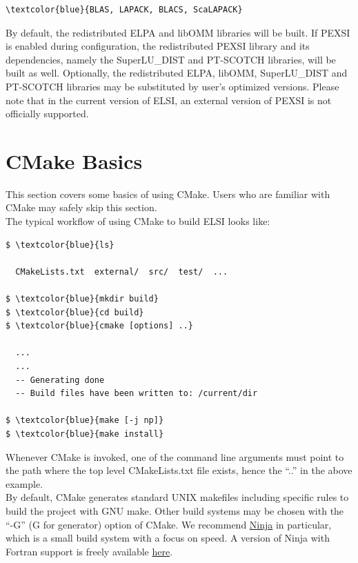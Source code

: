 \documentclass{report}
\begin{document}
\begin{Verbatim}[commandchars=\\\{\}]
\textcolor{blue}{BLAS, LAPACK, BLACS, ScaLAPACK}
\end{Verbatim}

By default, the redistributed ELPA and libOMM libraries will be built.  If PEXSI is enabled during configuration, the redistributed PEXSI library and its dependencies, namely the SuperLU\_DIST and PT-SCOTCH libraries, will be built as well.  Optionally, the redistributed ELPA, libOMM, SuperLU\_DIST and PT-SCOTCH libraries may be substituted by user's optimized versions.  Please note that in the current version of ELSI, an external version of PEXSI is not officially supported.\\

\section{CMake Basics}
\label{sec:cmake}
This section covers some basics of using CMake.  Users who are familiar with CMake may safely skip this section.\\

The typical workflow of using CMake to build ELSI looks like:\\

\begin{Verbatim}[commandchars=\\\{\}]
$ \textcolor{blue}{ls}

  CMakeLists.txt  external/  src/  test/  ...

$ \textcolor{blue}{mkdir build}
$ \textcolor{blue}{cd build}
$ \textcolor{blue}{cmake [options] ..}

  ...
  ...
  -- Generating done
  -- Build files have been written to: /current/dir

$ \textcolor{blue}{make [-j np]}
$ \textcolor{blue}{make install}
\end{Verbatim}

Whenever CMake is invoked, one of the command line arguments must point to the path where the top level CMakeLists.txt file exists, hence the ``..'' in the above example.\\

By default, CMake generates standard UNIX makefiles including specific rules to build the project with GNU make.  Other build systems may be chosen with the ``-G'' (G for generator) option of CMake.  We recommend \href{http://ninja-build.org}{Ninja} in particular, which is a small build system with a focus on speed.  A version of Ninja with Fortran support is freely available \href{http://github.com/Kitware/ninja}{here}.\\
\end{document}
